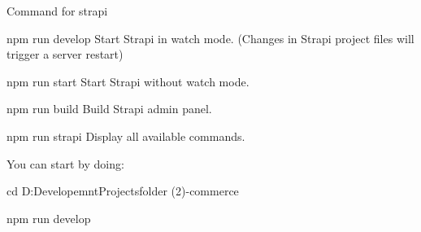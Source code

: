 
Command for strapi

npm run develop
Start Strapi in watch mode. (Changes in Strapi project files will trigger a server restart)

npm run start
Start Strapi without watch mode.

npm run build
Build Strapi admin panel.

npm run strapi
Display all available commands.

You can start by doing:

cd D:\Life Developemnt\Programming\Next Projects\New folder (2)\e-commerce

npm run develop
